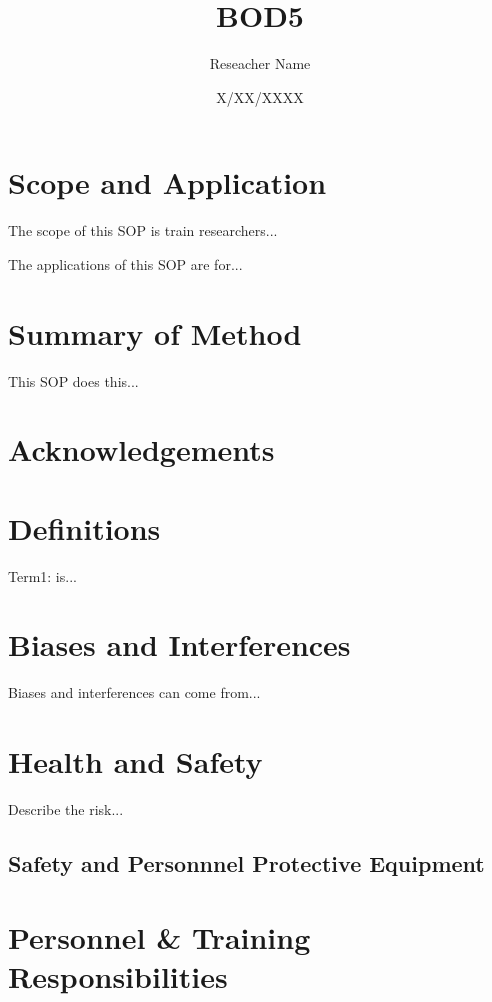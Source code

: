 \documentclass[12pt]{../SOP3_beta}\usepackage[]{graphicx}\usepackage[]{xcolor}
\title{BOD5}
\date{X/XX/XXXX}
\author{Reseacher Name}
\begin{document}

\maketitle

\section{Scope and Application}

\NP The scope of this SOP is train researchers...

\NP The applications of this SOP are for...

\section{Summary of Method}

\NP This SOP does this...

\tableofcontents

\newpage

\section{Acknowledgements}

\section{Definitions}

\NP Term1: is...

\section{Biases and Interferences}

\NP Biases and interferences can come from...

\section{Health and Safety}

\NP Describe the risk...


\subsection{Safety and Personnnel Protective Equipment}


\section{Personnel \& Training Responsibilities}
\end{document}
